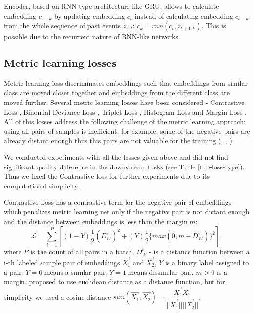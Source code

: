 \documentclass[sigconf]{acmart}
\begin{document}
Encoder, based on RNN-type architecture like GRU\cite{cho2014learning}, allows to calculate embedding $c_{t+k}$ by updating embedding $c_t$ instead of  calculating embedding $c_{t+k}$ from the whole sequence of past events $z_{1:t}$: $c_k = rnn(c_t, z_{t+1:k})$. This is possible due to the recurrent nature of RNN-like networks.

\subsection{Metric learning losses} \label{sec-ml-loss}

Metric learning loss discriminates embeddings such that embeddings from similar class are moved closer together and embeddings from the different class are moved further. Several metric learning losses have been considered - Contrastive Loss \cite{Hadsell:2006:DRL:1153171.1153654}, Binomial Deviance Loss \cite{Yi:2014:LUE:1407.4979}, Triplet Loss \cite{Hoffer:2015:LUE:1412.6622}, Histogram Loss \cite{histogram-loss} and Margin Loss \cite{wu2017sampling}. All of this losses address the following challenge of the metric learning approach: using all pairs of samples is inefficient, for example, some of the negative pairs are already distant enough thus this pairs are not valuable for the training (\cite{simo2015discriminative}, \cite{wu2017sampling}, \cite{Schroff2015FaceNetAU}).

We conducted experiments with all the losses given above and did not find significant quality difference in the downstream tasks (see Table \ref{tab-loss-type}). Thus we fixed the Contrastive loss for further experiments due to its computational simplicity.

Contrastive Loss has a contrastive term for the negative pair of embeddings which penalizes metric learning net only if the negative pair is not distant enough and the distance between embeddings is less than the margin $m$:  
\begin{equation}
 \mathcal{L} = \sum_{i=1}^P \left[ (1-Y)\dfrac{1}{2}(D_W^i)^2 +(Y)\dfrac{1}{2}\{max(0,m-D_W^i)\}^2 \right],
\end{equation}
where $P$ is the count of all pairs in a batch, $D_W^i$ - is a distance function between a i-th labeled sample pair of embeddings $\vec{X_1}$ and $\vec{X_2}$, 
$Y$ is a binary label assigned to a pair: $Y = 0$ means a similar pair, $Y = 1$ means dissimilar pair, $m > 0$ is a margin.
\cite{Hadsell:2006:DRL:1153171.1153654} proposed to use euclidean distance as a distance function, but for simplicity we used a cosine distance $sim(\vec{X_1},\vec{X_2})=\dfrac{\vec{X_1}\vec{X_2}}{||\vec{X_1}|| ||\vec{X_2}||}$.
\end{document}
